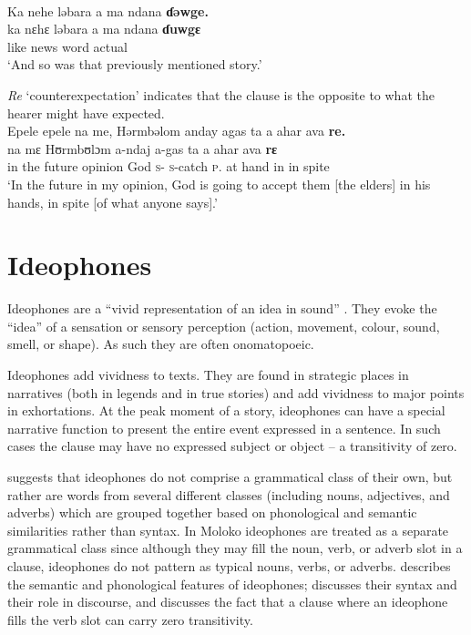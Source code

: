 \ea \label{ex:3:129}\\
Ka  nehe  ləbara  a  ma  ndana  \textbf{ɗəwge.}\\    
\gll ka  nɛhɛ  ləbara     a       ma      ndana     \textbf{ɗuwgɛ}\\     
    like  {\DEM}  news   {\GEN}    word     {\DEM}   actual\\
\glt ‘And so was that  previously mentioned story.’
\z

\textit{Re} ‘counterexpectation’  indicates that the clause is the opposite to what the hearer might have expected.  
 \clearpage
\ea \label{ex:3:130}\\
Epele  epele  na  me,  Hərmbəlom  anday  agas  ta  a  ahar  ava  \textbf{re.}\\
   na   mɛ  Hʊrmbʊlɔm   a-ndaj       a-gas   ta  a   ahar  ava   \textbf{rɛ}\\
      {in the future}  {\PSP}  opinion  God      \textsc{s}-{\PROG}    \textsc{s}-catch   \textsc{p}.{\DO}  at  hand  in     {in spite}\\
\glt  ‘In the future in my opinion, God is going to accept them [the elders] in his hands, in spite [of what anyone says].’
\z

\section{Ideophones}\label{sec:3.6}
\hypertarget{RefHeading1211241525720847}{}
Ideophones are a “vivid representation of an idea in sound” \citep[118]{Doke1935}. They evoke the ``idea'' of a sensation or sensory perception (action, movement, colour, sound, smell, or shape). As such they are often onomatopoeic. 

Ideophones add vividness to texts. They are found in strategic places in narratives (both in legends and in true stories) and add vividness to major points in exhortations. At the peak moment of a story, ideophones can have a special narrative function to present the entire event expressed in a sentence. In such cases the clause may have no expressed subject or object – a transitivity of zero.

\citet{Newman1968} suggests that ideophones do not comprise a grammatical class of their own, but rather are words from several different classes (including nouns, adjectives, and adverbs) which are grouped together based on phonological and semantic similarities rather than syntax. In Moloko ideophones are treated as a separate grammatical class since although they may fill the noun, verb, or adverb slot in a clause, ideophones do not pattern as typical nouns, verbs, or adverbs.  describes the semantic and phonological features of ideophones;  discusses their syntax and their role in discourse, and  discusses the fact that a clause where an ideophone fills the verb slot can carry zero transitivity.  

